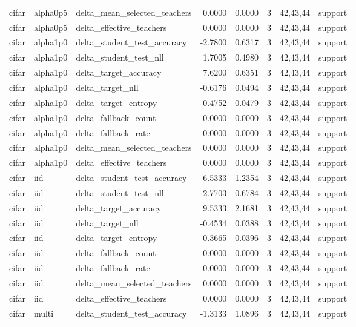 \begin{tabular}{lllrrrll}
cifar & alpha0p5 & delta\_mean\_selected\_teachers & 0.0000 & 0.0000 & 3 & 42,43,44 & support \\
cifar & alpha0p5 & delta\_effective\_teachers & 0.0000 & 0.0000 & 3 & 42,43,44 & support \\
cifar & alpha1p0 & delta\_student\_test\_accuracy & -2.7800 & 0.6317 & 3 & 42,43,44 & support \\
cifar & alpha1p0 & delta\_student\_test\_nll & 1.7005 & 0.4980 & 3 & 42,43,44 & support \\
cifar & alpha1p0 & delta\_target\_accuracy & 7.6200 & 0.6351 & 3 & 42,43,44 & support \\
cifar & alpha1p0 & delta\_target\_nll & -0.6176 & 0.0494 & 3 & 42,43,44 & support \\
cifar & alpha1p0 & delta\_target\_entropy & -0.4752 & 0.0479 & 3 & 42,43,44 & support \\
cifar & alpha1p0 & delta\_fallback\_count & 0.0000 & 0.0000 & 3 & 42,43,44 & support \\
cifar & alpha1p0 & delta\_fallback\_rate & 0.0000 & 0.0000 & 3 & 42,43,44 & support \\
cifar & alpha1p0 & delta\_mean\_selected\_teachers & 0.0000 & 0.0000 & 3 & 42,43,44 & support \\
cifar & alpha1p0 & delta\_effective\_teachers & 0.0000 & 0.0000 & 3 & 42,43,44 & support \\
cifar & iid & delta\_student\_test\_accuracy & -6.5333 & 1.2354 & 3 & 42,43,44 & support \\
cifar & iid & delta\_student\_test\_nll & 2.7703 & 0.6784 & 3 & 42,43,44 & support \\
cifar & iid & delta\_target\_accuracy & 9.5333 & 2.1681 & 3 & 42,43,44 & support \\
cifar & iid & delta\_target\_nll & -0.4534 & 0.0388 & 3 & 42,43,44 & support \\
cifar & iid & delta\_target\_entropy & -0.3665 & 0.0396 & 3 & 42,43,44 & support \\
cifar & iid & delta\_fallback\_count & 0.0000 & 0.0000 & 3 & 42,43,44 & support \\
cifar & iid & delta\_fallback\_rate & 0.0000 & 0.0000 & 3 & 42,43,44 & support \\
cifar & iid & delta\_mean\_selected\_teachers & 0.0000 & 0.0000 & 3 & 42,43,44 & support \\
cifar & iid & delta\_effective\_teachers & 0.0000 & 0.0000 & 3 & 42,43,44 & support \\
cifar & multi & delta\_student\_test\_accuracy & -1.3133 & 1.0896 & 3 & 42,43,44 & support \\

\end{tabular}
